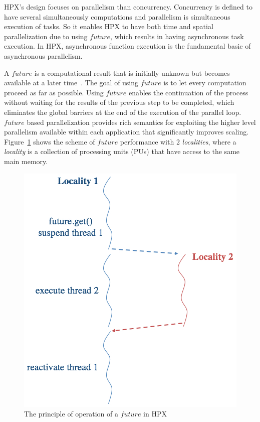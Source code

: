 \documentclass[conference]{IEEEtran}
\begin{document}
HPX's design focuses on parallelism than concurrency. Concurrency is defined to have several simultaneously computations and parallelism is simultaneous execution of tasks\cite{r15}. So it enables HPX to have both time and spatial parallelization \cite{r19} due to using \textit{$future$}, which results in having asynchronous task execution. In HPX, asynchronous function execution is the fundamental basic of asynchronous parallelism.

A \textit{$future$} is a computational result that is initially unknown but becomes available at a later time~\cite{r20}. The goal of using \textit{$future$} is to let every computation proceed as far as possible. Using \textit{$future$} enables the continuation of the process without waiting for the results of the previous step to be completed, which eliminates the global barriers at the end of the execution of the parallel loop. \textit{$future$} based parallelization provides rich semantics for exploiting the higher level parallelism available within each application that significantly improves scaling. Figure~\ref{f4} shows the scheme of \textit{$future$} performance with 2 \textit{localities}, where a \textit{locality} is a collection of processing units (PUs) that have access to the same main memory. 


\begin{figure} [!h]
\begin{center}
\centering
\includegraphics[width=0.75\columnwidth]{Pictures/f4a.jpg}
\caption {The principle of operation of a \textit{$future$} in HPX}
\label{f4}
\end{center}
\end{figure}
\end{document}
